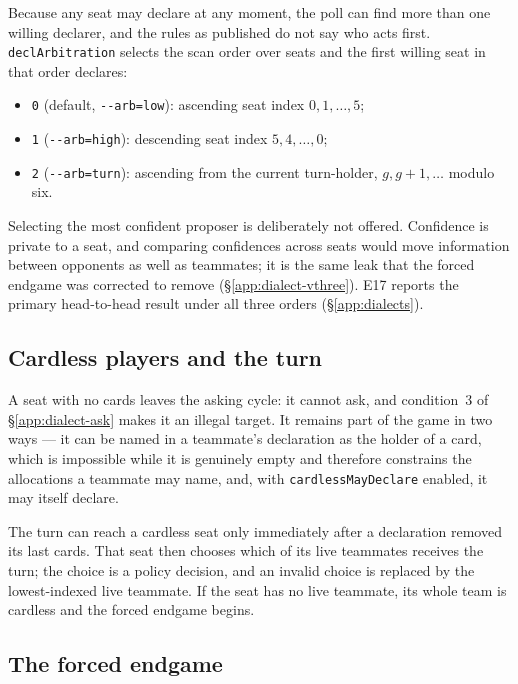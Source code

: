 Because any seat may declare at any moment, the poll can find more than one
willing declarer, and the rules as published do not say who acts first.
\texttt{declArbitration} selects the scan order over seats and the first willing
seat in that order declares:

\begin{itemize}
  \item \texttt{0} (default, \texttt{-{}-arb=low}): ascending seat index
        $0,1,\dots,5$;
  \item \texttt{1} (\texttt{-{}-arb=high}): descending seat index
        $5,4,\dots,0$;
  \item \texttt{2} (\texttt{-{}-arb=turn}): ascending from the current
        turn-holder, $g, g+1, \dots$ modulo six.
\end{itemize}

Selecting the most confident proposer is deliberately not offered. Confidence is
private to a seat, and comparing confidences across seats would move information
between opponents as well as teammates; it is the same leak that the forced
endgame was corrected to remove (\S\ref{app:dialect-vthree}). E17 reports the primary
head-to-head result under all three orders (\S\ref{app:dialects}).

\subsection{Cardless players and the turn}
\label{app:dialect-cardless}

A seat with no cards leaves the asking cycle: it cannot ask, and condition~3 of
\S\ref{app:dialect-ask} makes it an illegal target. It remains part of the game
in two ways --- it can be named in a teammate's declaration as the holder of a
card, which is impossible while it is genuinely empty and therefore constrains
the allocations a teammate may name, and, with \texttt{cardlessMayDeclare}
enabled, it may itself declare.

The turn can reach a cardless seat only immediately after a declaration removed
its last cards. That seat then chooses which of its live teammates receives the
turn; the choice is a policy decision, and an invalid choice is replaced by the
lowest-indexed live teammate. If the seat has no live teammate, its whole team is
cardless and the forced endgame begins.

\subsection{The forced endgame}
\label{app:dialect-endgame}

